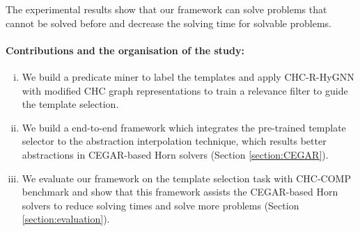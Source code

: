 
The experimental results show that our framework can solve problems that cannot be solved before and decrease the solving time for solvable problems. 


\paragraph{Contributions and the organisation of the study:}
\begin{enumerate}[(i)]
  \item We build a predicate miner to label the templates and apply CHC-R-HyGNN with modified CHC graph representations to train a relevance filter to guide the template selection.
  \item We build a end-to-end framework which integrates the pre-trained template selector to the abstraction interpolation technique, which results better abstractions in CEGAR-based Horn solvers (Section \ref{section:CEGAR}).
  \item We evaluate our framework on the template selection task with CHC-COMP benchmark and show that this framework assists the CEGAR-based Horn solvers to reduce solving times and solve more problems (Section \ref{section:evaluation}).
\end{enumerate}



